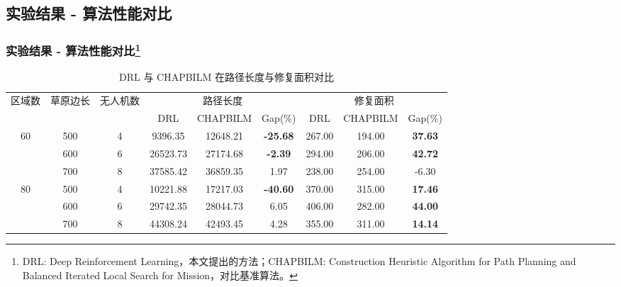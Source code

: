 \documentclass[11pt, aspectratio=169]{beamer}  %
\begin{document}
\subsection{实验结果 - 算法性能对比}
\begin{frame}
	\frametitle{实验结果 - 算法性能对比\footnote{DRL: Deep Reinforcement Learning，本文提出的方法；CHAPBILM: Construction Heuristic Algorithm for Path Planning and Balanced Iterated Local Search for Mission，对比基准算法。}}
	\begin{table}
		\centering
		\caption{DRL 与 CHAPBILM 在路径长度与修复面积对比}
		\small %
		\setlength{\tabcolsep}{3pt}
		\begin{tabular}{ccc ccc ccc}
			\toprule
			\multirow{2}{*}{区域数} & \multirow{2}{*}{草原边长} & \multirow{2}{*}{ 无人机数} & \multicolumn{3}{c}{路径长度} & \multicolumn{3}{c}{修复面积}                                                        \\
			\cmidrule(lr){4-6}\cmidrule(lr){7-9}
			                     &                       &                        & DRL                      & CHAPBILM                 & Gap(\%)         & DRL    & CHAPBILM & Gap(\%)        \\
			\midrule
			\multirow{3}{*}{60}
			                     & 500                   & 4                      & 9396.35                  & 12648.21                 & \textbf{-25.68} & 267.00 & 194.00   & \textbf{37.63} \\
			                     & 600                   & 6                      & 26523.73                 & 27174.68                 & \textbf{-2.39}  & 294.00 & 206.00   & \textbf{42.72} \\
			                     & 700                   & 8                      & 37585.42                 & 36859.35                 & 1.97            & 238.00 & 254.00   & -6.30          \\
			\midrule
			\multirow{3}{*}{80}
			                     & 500                   & 4                      & 10221.88                 & 17217.03                 & \textbf{-40.60} & 370.00 & 315.00   & \textbf{17.46} \\
			                     & 600                   & 6                      & 29742.35                 & 28044.73                 & 6.05            & 406.00 & 282.00   & \textbf{44.00} \\
			                     & 700                   & 8                      & 44308.24                 & 42493.45                 & 4.28            & 355.00 & 311.00   & \textbf{14.14} \\
			\bottomrule
		\end{tabular}
		\label{tab:combined_comparison}
	\end{table}
\end{frame}
\end{document}
